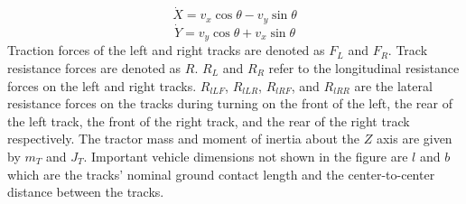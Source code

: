 \begin{equation}
      \dot X = v_x\cos\theta - v_y\sin\theta
\end{equation}
\begin{equation}
      \dot Y = v_y\cos\theta + v_x\sin\theta
\end{equation}    
Traction forces of the left and right tracks are denoted as $F_L$ and $F_R$. Track resistance forces are denoted as $R$. $R_L$ and $R_R$ refer to the longitudinal resistance forces on the left and right tracks. $R_{lLF}$, $R_{lLR}$, $R_{lRF}$, and $R_{lRR}$ are the lateral resistance forces on the tracks during turning on the front of the left, the rear of the left track, the front of the right track, and the rear of the right track respectively. The tractor mass and moment of inertia about the $Z$ axis are given by $m_T$ and $J_T$. Important vehicle dimensions not shown in the figure are $l$ and $b$ which are the tracks' nominal ground contact length and the center-to-center distance between the tracks.